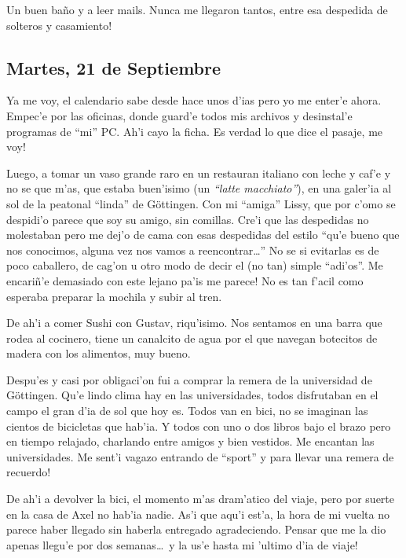 Un buen ba\~no y a leer mails. \textexclamdown Nunca me llegaron tantos, entre
esa despedida de solteros y casamiento!

\subsection*{Martes, 21 de Septiembre}

Ya me voy, el calendario sabe desde hace unos d'ias pero yo me enter'e ahora.
Empec'e por las oficinas, donde guard'e todos mis archivos y desinstal'e
programas de ``mi'' {\small PC}. Ah'i cayo la ficha. Es verdad lo que dice el
pasaje, \textexclamdown me voy!

Luego, a tomar un vaso grande raro en un restauran italiano con leche y caf'e y
no se que m'as, que estaba buen'isimo (un {\sl ``latte macchiato''}), en una
galer'ia al sol de la peatonal ``linda'' de G\"ottingen. Con mi ``amiga'' Lissy,
que por c'omo se despidi'o parece que soy su amigo, sin comillas. Cre'i que las
despedidas no molestaban pero me dej'o de cama con esas despedidas del estilo
``qu'e bueno que nos conocimos, alguna vez nos vamos a reencontrar\ldots'' No se
si evitarlas es de poco caballero, de cag'on u otro modo de decir el (no tan)
simple ``adi'os''. \textexclamdown Me encari\~n'e demasiado con este lejano
pa'is me parece! No es tan f'acil como esperaba preparar la mochila y subir al
tren.

De ah'i a comer Sushi con Gustav, riqu'isimo. Nos sentamos en una barra que
rodea al cocinero, tiene un canalcito de agua por el que navegan botecitos de
madera con los alimentos, muy bueno.

Despu'es y casi por obligaci'on fui a comprar la remera de la universidad de
G\"ottingen. Qu'e lindo clima hay en las universidades, todos disfrutaban en el
campo el gran d'ia de sol que hoy es. Todos van en bici, no se imaginan las
cientos de bicicletas que hab'ia. Y todos con uno o dos libros bajo el brazo
pero en tiempo relajado, charlando entre amigos y bien vestidos. Me encantan las
universidades. \textexclamdown Me sent'i vagazo entrando de ``sport'' y para
llevar una remera de recuerdo!

De ah'i a devolver la bici, el momento m'as dram'atico del viaje, pero por
suerte en la casa de Axel no hab'ia nadie. As'i que aqu'i est'a, la hora de mi
vuelta no parece haber llegado sin haberla entregado agradeciendo. Pensar que me
la dio apenas llegu'e por dos semanas\ldots\ \textexclamdown y la us'e hasta mi
'ultimo d'ia de viaje!

